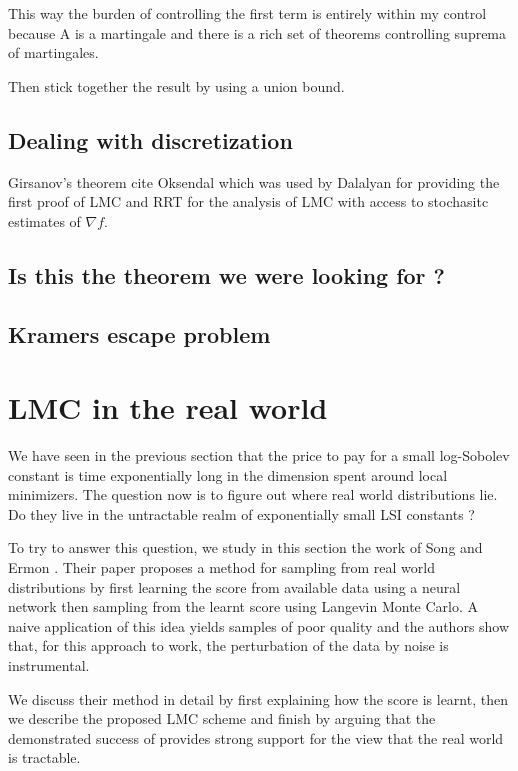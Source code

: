 \documentclass[11pt,twoside]{article}
\begin{document}
This way the burden of controlling the first term is entirely within my control because A is a martingale and there is a rich set of theorems controlling suprema of martingales.

Then stick together the result by using a union bound.

\subsection{Dealing with discretization}

Girsanov's theorem cite Oksendal which was used by Dalalyan for providing the first proof of LMC and RRT for the analysis of LMC with access to stochasitc estimates of $\nabla f$.

\subsection{Is this the theorem we were looking for ?}

\subsection{Kramers escape problem}

\section{LMC in the real world}

We have seen in the previous section that the price to pay for a small log-Sobolev constant is time exponentially long in the dimension spent around local minimizers. The question now is to figure out where real world distributions lie. Do they live in the untractable realm of exponentially small LSI constants ?

To try to answer this question, we study in this section the work of Song and Ermon \cite{song_generative_2019}. Their paper proposes a method for sampling from real world distributions by first learning the score from available data using a neural network then sampling from the learnt score using Langevin Monte Carlo. A naive application of this idea yields samples of poor quality and the authors show that, for this approach to work, the perturbation of the data by noise is instrumental.

We discuss their method in detail by first explaining how the score is learnt, then we describe the proposed LMC scheme and finish by arguing that the demonstrated success of \cite{song_generative_2019} provides strong support for the view that the real world is tractable.
\end{document}
